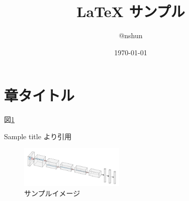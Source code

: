 \documentclass[dvipdfmx,uplatex]{jsarticle}
\title{ {\LaTeX} サンプル}
\author{@nshun}
\date{\today}
\begin{document}
\maketitle %

\section{章タイトル}

図\ref{fig:sample}

Sample title \cite{sample} より引用

\begin{figure}[htbp] %
  \begin{center}
    \includegraphics[width=50mm]{fig/sample.png}
    \caption{サンプルイメージ}
    \label{fig:sample}
  \end{center}
\end{figure}

\printbibliography[title=参考文献] %
\end{document}
